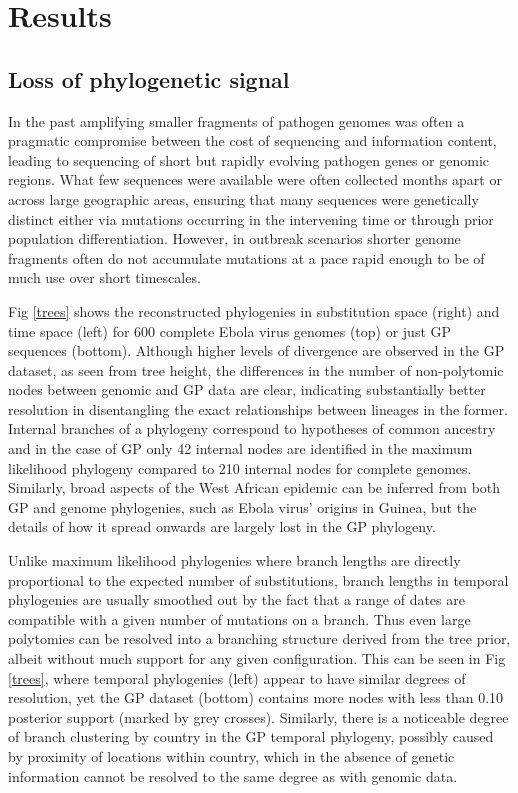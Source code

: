 \documentclass[11pt,oneside,letterpaper]{article}
\begin{document}
\section*{Results}

\subsection*{Loss of phylogenetic signal}
In the past amplifying smaller fragments of pathogen genomes was often a pragmatic compromise between the cost of sequencing and information content, leading to sequencing of short but rapidly evolving pathogen genes or genomic regions.
What few sequences were available were often collected months apart or across large geographic areas, ensuring that many sequences were genetically distinct either via mutations occurring in the intervening time or through prior population differentiation.
However, in outbreak scenarios shorter genome fragments often do not accumulate mutations at a pace rapid enough to be of much use over short timescales.

Fig \ref{trees} shows the reconstructed phylogenies in substitution space (right) and time space (left) for 600 complete Ebola virus genomes (top) or just GP sequences (bottom).
Although higher levels of divergence are observed in the GP dataset, as seen from tree height, the differences in the number of non-polytomic nodes between genomic and GP data are clear, indicating substantially better resolution in disentangling the exact relationships between lineages in the former.
Internal branches of a phylogeny correspond to hypotheses of common ancestry and in the case of GP only 42 internal nodes are identified in the maximum likelihood phylogeny compared to 210 internal nodes for complete genomes.
Similarly, broad aspects of the West African epidemic can be inferred from both GP and genome phylogenies, such as Ebola virus' origins in Guinea, but the details of how it spread onwards are largely lost in the GP phylogeny.

Unlike maximum likelihood phylogenies where branch lengths are directly proportional to the expected number of substitutions, branch lengths in temporal phylogenies are usually smoothed out by the fact that a range of dates are compatible with a given number of mutations on a branch.
Thus even large polytomies can be resolved into a branching structure derived from the tree prior, albeit without much support for any given configuration.
This can be seen in Fig \ref{trees}, where temporal phylogenies (left) appear to have similar degrees of resolution, yet the GP dataset (bottom) contains more nodes with less than 0.10 posterior support (marked by grey crosses).
Similarly, there is a noticeable degree of branch clustering by country in the GP temporal phylogeny, possibly caused by proximity of locations within country, which in the absence of genetic information cannot be resolved to the same degree as with genomic data.
\end{document}
